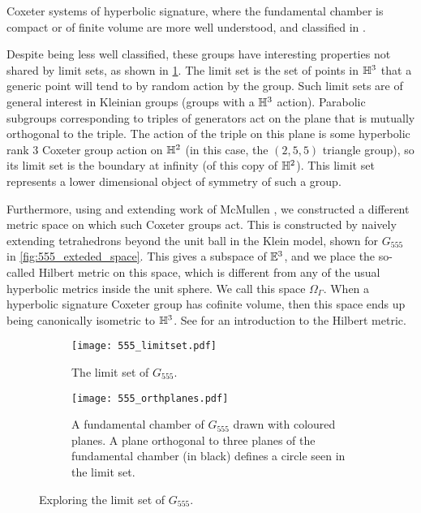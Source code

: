 Coxeter systems of hyperbolic signature, where the fundamental chamber is compact or of finite volume are more well understood, and classified in \cite[Section 6.9]{humphreys_reflection_1990}.

Despite being less well classified, these groups have interesting properties not shared by limit sets, as shown in \cref{fig:555_limitset}.
The limit set is the set of points in $\mathbb{H}^3$ that a generic point will tend to by random action by the group.
Such limit sets are of general interest in Kleinian groups (groups with a $\mathbb{H}^3$ action).
Parabolic subgroups corresponding to triples of generators act on the plane that is mutually orthogonal to the triple.
The action of the triple on this plane is some hyperbolic rank 3 Coxeter group action on $\mathbb{H}^2$ (in this case, the $(2,5,5)$ triangle group), so its limit set is the boundary at infinity (of this copy of $\mathbb{H}^2$).
This limit set represents a lower dimensional object of symmetry of such a group.

Furthermore, using and extending work of McMullen \cite{mcmullen_coxeter_2002}, we constructed a different metric space on which such Coxeter groups act.
This is constructed by naively extending tetrahedrons beyond the unit ball in the Klein model, shown for $G_{555}$ in \cref{fig:555_exteded_space}.
This gives a subspace of $\mathbb{E}^3$, and we place the so-called Hilbert metric on this space, which is different from any of the usual hyperbolic metrics inside the unit sphere.
We call this space $\Omega_\Gamma$.
When a hyperbolic signature Coxeter group has cofinite volume, then this space ends up being canonically isometric to  $\mathbb{H}^3$.
See \cite{papadopoulos_troyanov_handbook_2014} for an introduction to the Hilbert metric.

\begin{figure}
	\centering
	\begin{subfigure}[t]{.45\textwidth}
		\centering
		\texttt{[image: 555\_limitset.pdf]}
		\caption{The limit set of $G_{555}$.}
		\label{fig:555_limitset}
	\end{subfigure}
	\hspace{0.2ex}
	\begin{subfigure}[t]{.45\textwidth}
		\centering
		\texttt{[image: 555\_orthplanes.pdf]}
		\caption{A fundamental chamber of $G_{555}$ drawn with coloured planes.
			A plane orthogonal to three planes of the fundamental chamber (in black) defines a circle seen in the limit set.}
		\label{fig:555_orthogonal_planes}
	\end{subfigure}%
	\caption{Exploring the limit set of $G_{555}$.}
\end{figure}

